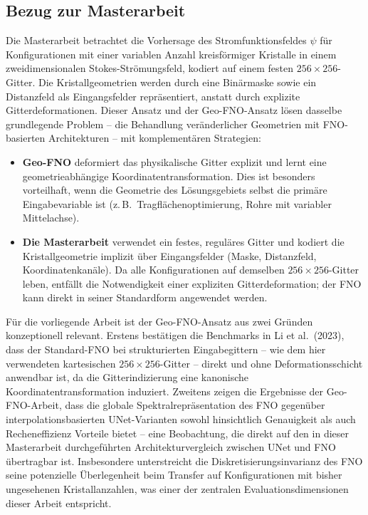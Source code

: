 \documentclass[a4paper,12pt]{article}
\begin{document}
\subsection*{Bezug zur Masterarbeit}

Die Masterarbeit betrachtet die Vorhersage des Stromfunktionsfeldes $\psi$ für Konfigurationen mit einer variablen Anzahl kreisförmiger Kristalle in einem zweidimensionalen Stokes-Strömungsfeld, kodiert auf einem festen $256 \times 256$-Gitter. Die Kristallgeometrien werden durch eine Binärmaske sowie ein Distanzfeld als Eingangsfelder repräsentiert, anstatt durch explizite Gitterdeformationen. Dieser Ansatz und der Geo-FNO-Ansatz lösen dasselbe grundlegende Problem -- die Behandlung veränderlicher Geometrien mit FNO-basierten Architekturen -- mit komplementären Strategien:

\begin{itemize}
    \item \textbf{Geo-FNO} deformiert das physikalische Gitter explizit und lernt eine geometrieabhängige Koordinatentransformation. Dies ist besonders vorteilhaft, wenn die Geometrie des Lösungsgebiets selbst die primäre Eingabevariable ist (z.\,B.\ Tragflächenoptimierung, Rohre mit variabler Mittelachse).
    \item \textbf{Die Masterarbeit} verwendet ein festes, reguläres Gitter und kodiert die Kristallgeometrie implizit über Eingangsfelder (Maske, Distanzfeld, Koordinatenkanäle). Da alle Konfigurationen auf demselben $256 \times 256$-Gitter leben, entfällt die Notwendigkeit einer expliziten Gitterdeformation; der FNO kann direkt in seiner Standardform angewendet werden.
\end{itemize}

Für die vorliegende Arbeit ist der Geo-FNO-Ansatz aus zwei Gründen konzeptionell relevant. Erstens bestätigen die Benchmarks in Li et al.\ (2023), dass der Standard-FNO bei strukturierten Eingabegittern -- wie dem hier verwendeten kartesischen $256 \times 256$-Gitter -- direkt und ohne Deformationsschicht anwendbar ist, da die Gitterindizierung eine kanonische Koordinatentransformation induziert. Zweitens zeigen die Ergebnisse der Geo-FNO-Arbeit, dass die globale Spektralrepräsentation des FNO gegenüber interpolationsbasierten UNet-Varianten sowohl hinsichtlich Genauigkeit als auch Recheneffizienz Vorteile bietet -- eine Beobachtung, die direkt auf den in dieser Masterarbeit durchgeführten Architekturvergleich zwischen UNet und FNO übertragbar ist. Insbesondere unterstreicht die Diskretisierungsinvarianz des FNO seine potenzielle Überlegenheit beim Transfer auf Konfigurationen mit bisher ungesehenen Kristallanzahlen, was einer der zentralen Evaluationsdimensionen dieser Arbeit entspricht.
\end{document}
